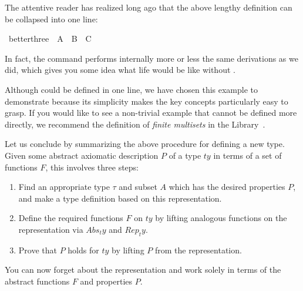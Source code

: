 \begin{isabellebody}
\begin{isamarkuptext}
The attentive reader has realized long ago that the
above lengthy definition can be collapsed into one line:%
\end{isamarkuptext}%
\isamarkuptrue%
\isamarkupfalse%
\ better{}three\ {}\ A\ {}\ B\ {}\ C%
\begin{isamarkuptext}%
\noindent
In fact, the  command performs internally more or less
the same derivations as we did, which gives you some idea what life would be
like without .

Although  could be defined in one line, we have chosen this
example to demonstrate  because its simplicity makes the
key concepts particularly easy to grasp. If you would like to see a
non-trivial example that cannot be defined more directly, we recommend the
definition of \emph{finite multisets} in the Library~\cite{HOL-Library}.

Let us conclude by summarizing the above procedure for defining a new type.
Given some abstract axiomatic description $P$ of a type $ty$ in terms of a
set of functions $F$, this involves three steps:
\begin{enumerate}
\item Find an appropriate type $\tau$ and subset $A$ which has the desired
  properties $P$, and make a type definition based on this representation.
\item Define the required functions $F$ on $ty$ by lifting
analogous functions on the representation via $Abs_ty$ and $Rep_ty$.
\item Prove that $P$ holds for $ty$ by lifting $P$ from the representation.
\end{enumerate}
You can now forget about the representation and work solely in terms of the
abstract functions $F$ and properties $P$.%
%
%
\end{isamarkuptext}%
\isamarkuptrue%
%
\isadelimtheory
%
\endisadelimtheory
%
\isatagtheory
%
\endisatagtheory
{\isafoldtheory}%
%
\isadelimtheory
%
\endisadelimtheory
\end{isabellebody}%
